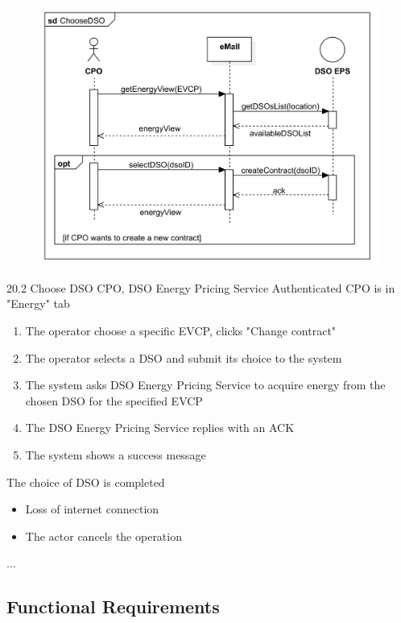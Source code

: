 \usecase
{
    \begin{figure}[H]
        \centering
        \includegraphics[scale=0.9]{src/sequence_diagram/retrievePrices&chooseDSO.png}
    \end{figure}
}
{20.2}
{Choose DSO} %
{CPO, DSO Energy Pricing Service} %
{Authenticated CPO is in "Energy" tab} %
{ %
    \begin{enumerate}
        \item The operator choose a specific EVCP, clicks "Change contract"
        \item The operator selects a DSO and submit its choice to the system
        \item The system asks DSO Energy Pricing Service to acquire energy from the chosen DSO for the specified EVCP
        \item The DSO Energy Pricing Service replies with an ACK
        \item The system shows a success message
    \end{enumerate}
}
{The choice of DSO is completed} %
{ %
    \begin{itemize}
        \item Loss of internet connection
        \item The actor cancels the operation
    \end{itemize}
}
{ %
    ...
}

\pagebreak


\subsection{Functional Requirements}


